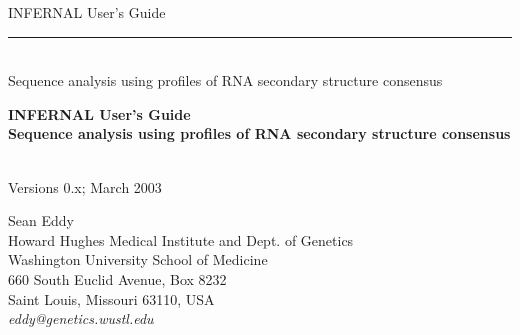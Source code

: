 \begin{titlepage}
{\Large

\vspace*{\fill}

\begin{latexonly}
\noindent
{\Huge \textsf{INFERNAL User's Guide}} \\ 
\rule[2pt]{\textwidth}{1pt} \\
\hspace*{\fill} {\large \textsf{Sequence analysis using profiles of RNA secondary structure consensus}\\}
\end{latexonly}

\begin{htmlonly}
\begin{center}
{\Huge \textbf{INFERNAL User's Guide}}\\
{\large \textbf{Sequence analysis using profiles of RNA secondary
structure consensus}}\\
\end{center}
\end{htmlonly}

\vspace*{\fill}

\begin{center}
\textsl{}\\
Versions 0.x; March 2003 \\ 

\vspace*{\fill}

Sean Eddy\\
Howard Hughes Medical Institute and Dept. of Genetics\\
Washington University School of Medicine\\
660 South Euclid Avenue, Box 8232\\
Saint Louis, Missouri 63110, USA\\
\textsl{eddy@genetics.wustl.edu} \\
\end{center}

\vspace*{\fill}

}
\end{titlepage}
